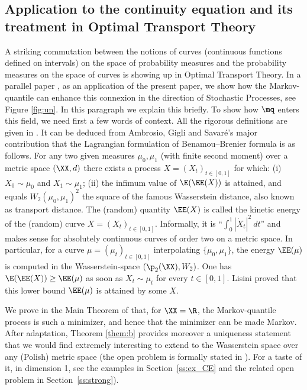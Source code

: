 \subsection{Application to the continuity equation and its treatment in Optimal Transport Theory}\label{subsec:intro_transport}
A striking commutation between the notions of curves (continuous functions defined on intervals) on the space of probability measures and the probability measures on the space of curves is showing up in Optimal Transport Theory. In a parallel paper \cite{BouJui2}, as an application of the present paper, we show how the Markov-quantile can enhance this connexion in the direction of Stochastic Processes, see Figure \ref{fig:un}. In this paragraph we explain this briefly. To show how $\mq$ enters this field, we need first a few words of context. All the rigorous definitions are given in \cite{BouJui2}. It can be deduced from Ambrosio, Gigli and Savaré's major contribution \cite{AGS} that the Lagrangian formulation of Benamou--Brenier formula \cite{BeBr} is as follows. For any two given measures $\mu_0, \mu_1$ (with finite second moment) over a metric space $(\XX,d)$ there exists a process $X=(X_t)_{t\in [0,1]}$ for which: (i) $X_0\sim \mu_0$ and $X_1\sim \mu_1$; (ii) the infimum value of $\E(\EE(X))$ is attained, and equals $W_2(\mu_0,\mu_1)^2$ the square of the famous Wasserstein distance, also known as transport distance. The (random) quantity $\EE(X)$ is called the kinetic energy of the (random) curve $X=(X_t)_{t\in [0,1]}$. Informally, it is ``$\int_0^1 |\dot X_t|^2\ dt$'' and makes sense for absolutely continuous curves of order two on a metric space. In particular, for a curve $\mu=(\mu_t)_{t\in [0,1]}$ interpolating $\{\mu_0,\mu_1\}$, the energy $\EE(\mu)$ is computed in the Wasserstein-space $(\p_2(\XX),W_2)$. One has $\E(\EE(X))\geq \EE(\mu)$ as soon as $X_t\sim \mu_t$ for every $t\in [0,1]$. Lisini proved \cite{Lis} that this lower bound $\EE(\mu)$ is attained by some $X$.

We prove in the Main Theorem of \cite{BouJui2} that, for $\XX=\R$, the Markov-quantile process is such a minimizer, and hence that the minimizer can be made Markov. After adaptation, Theorem \ref{them:b} provides moreover a uniqueness statement that we would find extremely interesting to extend to the Wasserstein space over any (Polish) metric space (the open problem is formally stated in \cite{BouJui2}). For a taste of it, in dimension 1, see the examples in Section~\ref{ss:ex_CE} and the related open problem in Section~\ref{ss:strong}).

